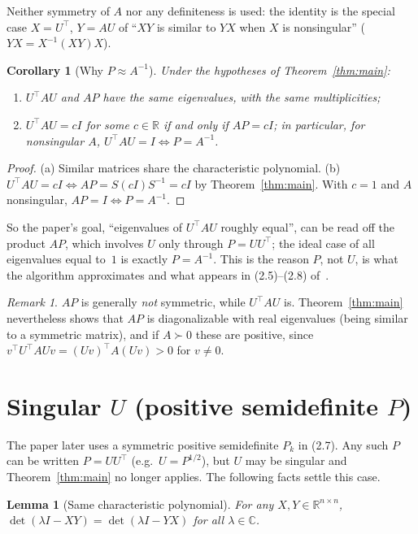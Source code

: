 \documentclass[11pt]{article}
\newtheorem{lemma}{Lemma}
\newtheorem{corollary}{Corollary}
\theoremstyle{remark}
\newtheorem{remark}{Remark}
\theoremstyle{definition}
\newcommand{\R}{\mathbb{R}}
\begin{document}
Neither symmetry of $A$ nor any definiteness is used: the identity is the
special case $X=U^{\top}$, $Y=AU$ of ``$XY$ is similar to $YX$ when $X$ is
nonsingular'' ($YX=X^{-1}(XY)X$).

\begin{corollary}[Why $P\approx A^{-1}$]\label{cor:goal}
Under the hypotheses of Theorem~\ref{thm:main}:
\begin{enumerate}
\item[(a)] $U^{\top}AU$ and $AP$ have the same eigenvalues, with the same
  multiplicities;
\item[(b)] $U^{\top}AU=cI$ for some $c\in\R$ if and only if $AP=cI$; in
  particular, for nonsingular $A$, $U^{\top}AU=I\iff P=A^{-1}$.
\end{enumerate}
\end{corollary}

\begin{proof}
(a) Similar matrices share the characteristic polynomial.
(b) $U^{\top}AU=cI\iff AP=S(cI)S^{-1}=cI$ by Theorem~\ref{thm:main}. With $c=1$
and $A$ nonsingular, $AP=I\iff P=A^{-1}$.
\end{proof}

So the paper's goal, ``eigenvalues of $U^{\top}AU$ roughly equal'', can be
read off the product $AP$, which involves $U$ only through $P=UU^{\top}$; the
ideal case of all eigenvalues equal to~$1$ is exactly $P=A^{-1}$. This is the
reason $P$, not $U$, is what the algorithm approximates and what appears in
(2.5)--(2.8) of~\cite{HZ13}.

\begin{remark}
$AP$ is generally \emph{not} symmetric, while $U^{\top}AU$ is. Theorem~\ref{thm:main}
nevertheless shows that $AP$ is diagonalizable with real eigenvalues (being
similar to a symmetric matrix), and if $A\succ0$ these are positive, since
$v^{\top}U^{\top}AUv=(Uv)^{\top}A(Uv)>0$ for $v\ne0$.
\end{remark}

\section{Singular $U$ (positive semidefinite $P$)}

The paper later uses a symmetric positive semidefinite $P_k$ in (2.7). Any such
$P$ can be written $P=UU^{\top}$ (e.g.\ $U=P^{1/2}$), but $U$ may be singular and
Theorem~\ref{thm:main} no longer applies. The following facts settle this case.

\begin{lemma}[Same characteristic polynomial]\label{lem:charpoly}
For any $X,Y\in\R^{n\times n}$, $\det(\lambda I-XY)=\det(\lambda I-YX)$ for all
$\lambda\in\mathbb C$.
\end{lemma}
\end{document}
